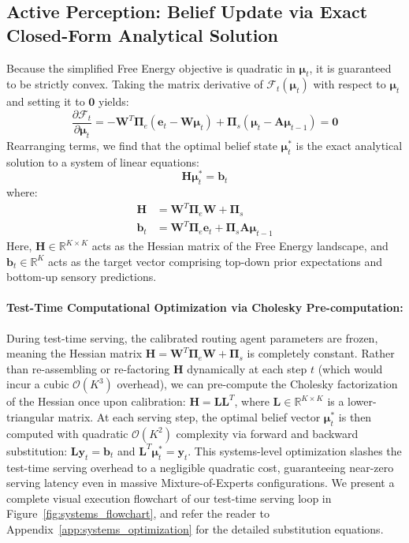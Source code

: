 \subsection{Active Perception: Belief Update via Exact Closed-Form Analytical Solution}
Because the simplified Free Energy objective is quadratic in $\mathbf{\mu}_t$, it is guaranteed to be strictly convex. Taking the matrix derivative of $\mathcal{F}_t(\mathbf{\mu}_t)$ with respect to $\mathbf{\mu}_t$ and setting it to $\mathbf{0}$ yields:
\begin{equation}
\frac{\partial \mathcal{F}_t}{\partial \mathbf{\mu}_t} = -\mathbf{W}^T \mathbf{\Pi}_e (\mathbf{e}_t - \mathbf{W}\mathbf{\mu}_t) + \mathbf{\Pi}_s (\mathbf{\mu}_t - \mathbf{A}\mathbf{\mu}_{t-1}) = \mathbf{0}
\end{equation}
Rearranging terms, we find that the optimal belief state $\mathbf{\mu}_t^*$ is the exact analytical solution to a system of linear equations:
\begin{equation}
\mathbf{H} \mathbf{\mu}_t^* = \mathbf{b}_t
\end{equation}
where:
\begin{align}
\mathbf{H} &= \mathbf{W}^T \mathbf{\Pi}_e \mathbf{W} + \mathbf{\Pi}_s \label{eq:hessian} \\
\mathbf{b}_t &= \mathbf{W}^T \mathbf{\Pi}_e \mathbf{e}_t + \mathbf{\Pi}_s \mathbf{A}\mathbf{\mu}_{t-1} \label{eq:target_vector}
\end{align}
Here, $\mathbf{H} \in \mathbb{R}^{K \times K}$ acts as the Hessian matrix of the Free Energy landscape, and $\mathbf{b}_t \in \mathbb{R}^K$ acts as the target vector comprising top-down prior expectations and bottom-up sensory predictions.

\paragraph{Test-Time Computational Optimization via Cholesky Pre-computation:}
During test-time serving, the calibrated routing agent parameters are frozen, meaning the Hessian matrix $\mathbf{H} = \mathbf{W}^T \mathbf{\Pi}_e \mathbf{W} + \mathbf{\Pi}_s$ is completely constant. Rather than re-assembling or re-factoring $\mathbf{H}$ dynamically at each step $t$ (which would incur a cubic $\mathcal{O}(K^3)$ overhead), we can pre-compute the Cholesky factorization of the Hessian once upon calibration: $\mathbf{H} = \mathbf{L} \mathbf{L}^T$, where $\mathbf{L} \in \mathbb{R}^{K \times K}$ is a lower-triangular matrix. At each serving step, the optimal belief vector $\mathbf{\mu}_t^*$ is then computed with quadratic $\mathcal{O}(K^2)$ complexity via forward and backward substitution: $\mathbf{L} \mathbf{y}_t = \mathbf{b}_t$ and $\mathbf{L}^T \mathbf{\mu}_t^* = \mathbf{y}_t$. This systems-level optimization slashes the test-time serving overhead to a negligible quadratic cost, guaranteeing near-zero serving latency even in massive Mixture-of-Experts configurations. We present a complete visual execution flowchart of our test-time serving loop in Figure~\ref{fig:systems_flowchart}, and refer the reader to Appendix~\ref{app:systems_optimization} for the detailed substitution equations.

